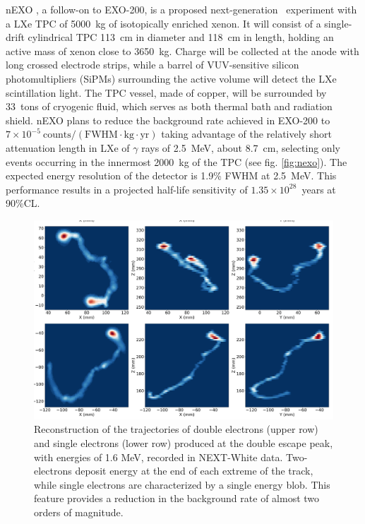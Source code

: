 nEXO \cite{nEXO:2018ylp,nEXO:2021ujk}, a follow-on to EXO-200, is a proposed next-generation \bbonu\ experiment with a LXe TPC of 5000~kg of isotopically enriched xenon. It will consist of a single-drift cylindrical TPC 113~cm in diameter and 118~cm in length, holding an active mass of xenon close to 3650~kg. Charge will be collected at the anode with long crossed electrode strips, while a barrel of VUV-sensitive silicon photomultipliers (SiPMs) surrounding the active volume will detect the LXe scintillation light. The TPC vessel, made of copper, will be surrounded by 33~tons of cryogenic fluid, which serves as both thermal bath and radiation shield. nEXO plans to reduce the background rate achieved in EXO-200 to $7\times10^{-5}~\mathrm{counts/(FWHM\cdot kg\cdot yr)}$ taking advantage of the relatively short attenuation length in LXe of $\gamma$ rays of 2.5~MeV, about 8.7~cm, selecting only events occurring in the innermost 2000~kg of the TPC (see fig. \ref{fig:nexo}). The expected energy resolution of the detector is 1.9\% FWHM at 2.5~MeV. This performance results in a projected half-life sensitivity of $1.35\times10^{28}$~years at 90\%CL.
  
\begin{figure}[tb]
\centering
\includegraphics[width=\textwidth]{img/nextTracks.pdf}
\caption{Reconstruction of the trajectories of double electrons (upper row) and single electrons (lower row) produced at the  double escape peak, with energies of 1.6 MeV, recorded in NEXT-White data. Two-electrons deposit energy at the end of each extreme of the track, while single electrons are characterized by a single energy blob. This feature provides a reduction in the background rate of almost two orders of magnitude.} \label{fig:next}
\end{figure}
  
